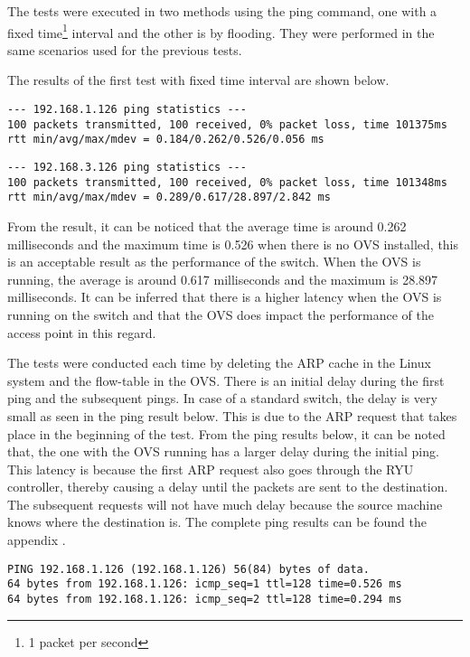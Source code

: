 The tests were executed in two methods using the ping command, one with a fixed time\footnote{1 packet per second} interval and the other is by flooding. They were performed in the same scenarios used for the previous tests.

The results of the first test with fixed time interval are shown below.
\begin{lstlisting}[caption={Ping Test Without OVS }, label={pingtest_no_ovs}]
--- 192.168.1.126 ping statistics ---
100 packets transmitted, 100 received, 0% packet loss, time 101375ms
rtt min/avg/max/mdev = 0.184/0.262/0.526/0.056 ms
\end{lstlisting}

\begin{lstlisting}[caption={Ping Test With OVS}, label={pingtest_ovs}]
--- 192.168.3.126 ping statistics ---
100 packets transmitted, 100 received, 0% packet loss, time 101348ms
rtt min/avg/max/mdev = 0.289/0.617/28.897/2.842 ms
\end{lstlisting}
From the result, it can be noticed that the average time is around 0.262 milliseconds and the maximum time is 0.526 when there is no OVS installed, this is an acceptable result as the performance of the switch. When the OVS is running, the average is around 0.617 milliseconds and the maximum is 28.897 milliseconds. It can be inferred that there is a higher latency when the OVS is running on the switch and that the OVS does impact the performance of the access point in this regard.

The tests were conducted each time by deleting the ARP cache in the Linux system and the flow-table in the OVS. There is an initial delay during the first ping and the subsequent pings. In case of a standard switch, the delay is very small as seen in the ping result below. This is due to the ARP request that takes place in the beginning of the test. From the ping results below, it can be noted that, the one with the OVS running has a larger delay during the initial ping. This latency is because the first ARP request also goes through the RYU controller, thereby causing a delay until the packets are sent to the destination. The subsequent requests will not have much delay because the source machine knows where the destination is. The complete ping results can be found the appendix .

\begin{lstlisting}[caption={Initial Ping result without OVS },label={lst:initial_ping_no_ovs}]
PING 192.168.1.126 (192.168.1.126) 56(84) bytes of data.
64 bytes from 192.168.1.126: icmp_seq=1 ttl=128 time=0.526 ms
64 bytes from 192.168.1.126: icmp_seq=2 ttl=128 time=0.294 ms
\end{lstlisting}

